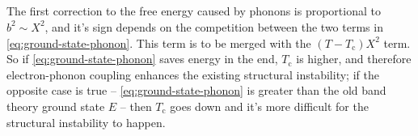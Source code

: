 \documentclass[hyperref, a4paper]{article}
\begin{document}
\subsection{}

The first correction to the free energy 
caused by phonons 
is proportional to $b^2 \sim X^2$,
and it's sign depends on the competition 
between the two terms in \eqref{eq:ground-state-phonon}.
This term is to be merged with the $(T - T_{\text{c}}) X^2$ term.
So if \eqref{eq:ground-state-phonon} saves energy in the end,
$T_{\text{c}}$ is higher, 
and therefore electron-phonon coupling enhances the existing structural instability;
if the opposite case is true -- \eqref{eq:ground-state-phonon} is greater than 
the old band theory ground state $E$ -- 
then $T_{\text{c}}$ goes down and it's more difficult for the structural instability to happen.

\printbibliography
\end{document}
